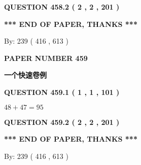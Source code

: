 \documentclass{ctexart}
\begin{document}
{\textbf{\Large{QUESTION
458.2 
 ( 2 , 2 , 201 )
}}}
  
  
   
   
 \vspace{0.2in}
 
   
   
   
   
\vspace{1.0in} 
{\textbf{\large{ *** END OF PAPER, THANKS *** }}} 
   
   
\hspace{1.0in} By: 
 239 ( 416 ,  613 )
   
   
   
   
\newpage 
\setcounter{page}{ 
   459001 } 
   
   
   
   
 {\textbf{ \Large{ PAPER NUMBER  459  }}}
   
   
\vspace{0.2in}
   
   
   
   
   
   
 \vspace{0.2in}
{\LARGE {\textbf{ 一个快速卷例}}}
   
   
  
\vspace{0.2in}
  
{\textbf{\Large{QUESTION
459.1 
 ( 1 , 1 , 101 )
}}}
  
  
 
 

$ %
48 +  %
47=   %
95$
 
 
  
\vspace{0.2in}
  
{\textbf{\Large{QUESTION
459.2 
 ( 2 , 2 , 201 )
}}}
  
  
   
   
 \vspace{0.2in}
 
   
   
   
   
\vspace{1.0in} 
{\textbf{\large{ *** END OF PAPER, THANKS *** }}} 
   
   
\hspace{1.0in} By: 
 239 ( 416 ,  613 )
   
   
   
   
\newpage 
\setcounter{page}{ 
   460001 } 
   
\end{document}
